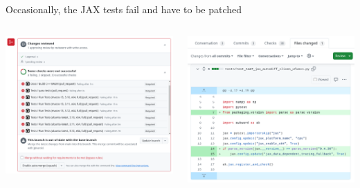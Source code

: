 \documentclass[aspectratio=169]{beamer}
\begin{document}
\begin{frame}{Occasionally, the JAX tests fail and have to be patched}
\vspace{0.25 cm}
\begin{columns}
\includegraphics[width=\linewidth]{jax-failures.png}

\includegraphics[width=\linewidth]{jax-failures-2.png}
\end{columns}
\end{frame}
\end{document}

